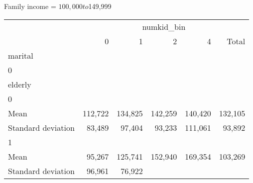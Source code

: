 Family income = $100,000 to $149,999
\begin{tabular}{llllll}
\cline{1-6}
\multicolumn{1}{c}{} &
  \multicolumn{5}{|c}{numkid\_bin} \\
\multicolumn{1}{c}{} &
  \multicolumn{1}{|r}{0} &
  \multicolumn{1}{r}{1} &
  \multicolumn{1}{r}{2} &
  \multicolumn{1}{r}{4} &
  \multicolumn{1}{r}{Total} \\
\cline{1-6}
\multicolumn{1}{l}{marital} &
  \multicolumn{1}{|r}{} &
  \multicolumn{1}{r}{} &
  \multicolumn{1}{r}{} &
  \multicolumn{1}{r}{} &
  \multicolumn{1}{r}{} \\
\multicolumn{1}{l}{\hspace{1em}0} &
  \multicolumn{1}{|r}{} &
  \multicolumn{1}{r}{} &
  \multicolumn{1}{r}{} &
  \multicolumn{1}{r}{} &
  \multicolumn{1}{r}{} \\
\multicolumn{1}{l}{\hspace{2em}elderly} &
  \multicolumn{1}{|r}{} &
  \multicolumn{1}{r}{} &
  \multicolumn{1}{r}{} &
  \multicolumn{1}{r}{} &
  \multicolumn{1}{r}{} \\
\multicolumn{1}{l}{\hspace{3em}0} &
  \multicolumn{1}{|r}{} &
  \multicolumn{1}{r}{} &
  \multicolumn{1}{r}{} &
  \multicolumn{1}{r}{} &
  \multicolumn{1}{r}{} \\
\multicolumn{1}{l}{\hspace{4em}Mean} &
  \multicolumn{1}{|r}{112,722} &
  \multicolumn{1}{r}{134,825} &
  \multicolumn{1}{r}{142,259} &
  \multicolumn{1}{r}{140,420} &
  \multicolumn{1}{r}{132,105} \\
\multicolumn{1}{l}{\hspace{4em}Standard deviation} &
  \multicolumn{1}{|r}{83,489} &
  \multicolumn{1}{r}{97,404} &
  \multicolumn{1}{r}{93,233} &
  \multicolumn{1}{r}{111,061} &
  \multicolumn{1}{r}{93,892} \\
\multicolumn{1}{l}{\hspace{3em}1} &
  \multicolumn{1}{|r}{} &
  \multicolumn{1}{r}{} &
  \multicolumn{1}{r}{} &
  \multicolumn{1}{r}{} &
  \multicolumn{1}{r}{} \\
\multicolumn{1}{l}{\hspace{4em}Mean} &
  \multicolumn{1}{|r}{95,267} &
  \multicolumn{1}{r}{125,741} &
  \multicolumn{1}{r}{152,940} &
  \multicolumn{1}{r}{169,354} &
  \multicolumn{1}{r}{103,269} \\
\multicolumn{1}{l}{\hspace{4em}Standard deviation} &
  \multicolumn{1}{|r}{96,961} &
  \multicolumn{1}{r}{76,922} &

\end{tabular}
